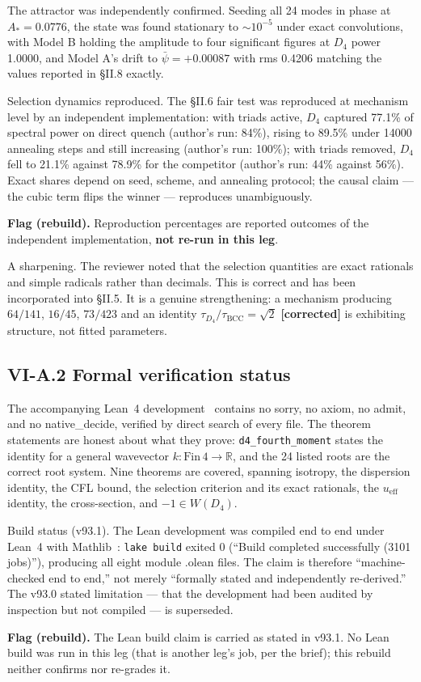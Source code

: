 \documentclass[11pt,a4paper]{article}
\newcommand{\flagbox}[1]{\par\smallskip\noindent\textbf{Flag (rebuild).} #1\par\smallskip}
\begin{document}
The attractor was independently confirmed. Seeding all 24 modes in phase at $A_* = 0.0776$, the state was found stationary to $\sim 10^{-5}$ under exact convolutions, with Model B holding the amplitude to four significant figures at $D_4$ power 1.0000, and Model A's drift to $\bar{\psi} = +0.00087$ with rms 0.4206 matching the values reported in \S II.8 exactly.

Selection dynamics reproduced. The \S II.6 fair test was reproduced at mechanism level by an independent implementation: with triads active, $D_4$ captured 77.1\% of spectral power on direct quench (author's run: 84\%), rising to 89.5\% under 14000 annealing steps and still increasing (author's run: 100\%); with triads removed, $D_4$ fell to 21.1\% against 78.9\% for the competitor (author's run: 44\% against 56\%). Exact shares depend on seed, scheme, and annealing protocol; the causal claim --- the cubic term flips the winner --- reproduces unambiguously.
\flagbox{Reproduction percentages are reported outcomes of the independent implementation, \textbf{not re-run in this leg}.}

A sharpening. The reviewer noted that the selection quantities are exact rationals and simple radicals rather than decimals. This is correct and has been incorporated into \S II.5. It is a genuine strengthening: a mechanism producing $64/141$, $16/45$, $73/423$ and an identity $\tau_{D_4}/\tau_{\mathrm{BCC}} = \sqrt{2}$ \textbf{[corrected]} is exhibiting structure, not fitted parameters.

\subsection{VI-A.2 Formal verification status}
The accompanying Lean~4 development~\cite{demoura2015} contains no sorry, no axiom, no admit, and no native\_decide, verified by direct search of every file. The theorem statements are honest about what they prove: \texttt{d4\_fourth\_moment} states the identity for a general wavevector $k : \mathrm{Fin}\,4 \to \mathbb{R}$, and the 24 listed roots are the correct root system. Nine theorems are covered, spanning isotropy, the dispersion identity, the CFL bound, the selection criterion and its exact rationals, the $u_{\mathrm{eff}}$ identity, the cross-section, and $-1 \in W(D_4)$.

Build status (v93.1). The Lean development was compiled end to end under Lean~4 with Mathlib~\cite{mathlib2020}: \texttt{lake build} exited 0 (``Build completed successfully (3101 jobs)''), producing all eight module .olean files. The claim is therefore ``machine-checked end to end,'' not merely ``formally stated and independently re-derived.'' The v93.0 stated limitation --- that the development had been audited by inspection but not compiled --- is superseded.
\flagbox{The Lean build claim is carried as stated in v93.1. No Lean build was run in this leg (that is another leg's job, per the brief); this rebuild neither confirms nor re-grades it.}
\end{document}
